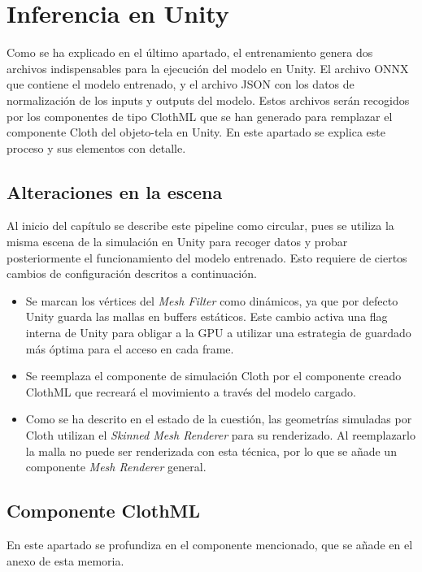 \section{Inferencia en Unity}
\label{sec:SimulacionUnity}

Como se ha explicado en el último apartado, el entrenamiento genera dos archivos indispensables para la ejecución del modelo en Unity. El archivo ONNX que contiene el modelo entrenado, y el archivo JSON con los datos de normalización de los inputs y outputs del modelo. Estos archivos serán recogidos por los componentes de tipo ClothML que se han generado para remplazar el componente Cloth del objeto-tela en Unity. En este apartado se explica este proceso y sus elementos con detalle.

\subsection{Alteraciones en la escena}
Al inicio del capítulo se describe este pipeline como circular, pues se utiliza la misma escena de la simulación en Unity para recoger datos y probar posteriormente el funcionamiento del modelo entrenado. Esto requiere de ciertos cambios de configuración descritos a continuación.

\begin{itemize}
    \item Se marcan los vértices del \textit{Mesh Filter} como dinámicos, ya que por defecto Unity guarda las mallas en buffers estáticos. Este cambio activa una flag interna de Unity para obligar a la GPU a utilizar una estrategia de guardado más óptima para el acceso en cada frame.
    \item Se reemplaza el componente de simulación Cloth por el componente creado ClothML que recreará el movimiento a través del modelo cargado.
    \item Como se ha descrito en el estado de la cuestión, las geometrías simuladas por Cloth utilizan el \textit{Skinned Mesh Renderer} para su renderizado. Al reemplazarlo la malla no puede ser renderizada con esta técnica, por lo que se añade un componente \textit{Mesh Renderer} general.
\end{itemize}

\subsection{Componente ClothML}

En este apartado se profundiza en el componente mencionado, que se añade en el anexo de esta memoria. %

